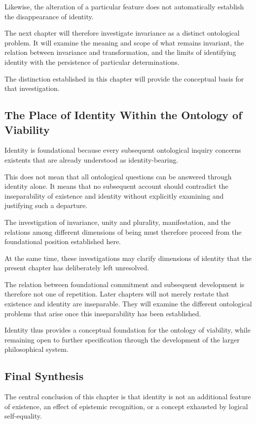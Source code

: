 Likewise, the alteration of a particular feature does not automatically establish the disappearance of identity.

The next chapter will therefore investigate invariance as a distinct ontological problem. It will examine the meaning and scope of what remains invariant, the relation between invariance and transformation, and the limits of identifying identity with the persistence of particular determinations.

The distinction established in this chapter will provide the conceptual basis for that investigation.

\subsection{The Place of Identity Within the Ontology of Viability}

Identity is foundational because every subsequent ontological inquiry concerns existents that are already understood as identity-bearing.

This does not mean that all ontological questions can be answered through identity alone. It means that no subsequent account should contradict the inseparability of existence and identity without explicitly examining and justifying such a departure.

The investigation of invariance, unity and plurality, manifestation, and the relations among different dimensions of being must therefore proceed from the foundational position established here.

At the same time, these investigations may clarify dimensions of identity that the present chapter has deliberately left unresolved.

The relation between foundational commitment and subsequent development is therefore not one of repetition. Later chapters will not merely restate that existence and identity are inseparable. They will examine the different ontological problems that arise once this inseparability has been established.

Identity thus provides a conceptual foundation for the ontology of viability, while remaining open to further specification through the development of the larger philosophical system.

\subsection{Final Synthesis}

The central conclusion of this chapter is that identity is not an additional feature of existence, an effect of epistemic recognition, or a concept exhausted by logical self-equality.

